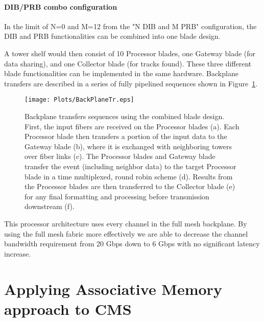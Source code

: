 \paragraph{DIB/PRB combo configuration}

\noindent In the limit of N=0 and M=12 from the "N DIB and M PRB" configuration, the DIB and PRB functionalities can be combined into one blade design.



\noindent A tower shelf would then consist of 10 Processor blades, one Gateway blade (for data sharing), and one Collector blade (for tracks found). These three different blade functionalities can be implemented in the same hardware. Backplane transfers are described in a series of fully pipelined sequences shown in Figure~\ref{fig:BackPlaneTr}.

\begin{figure}[ht!]
\centering
\texttt{[image: Plots/BackPlaneTr.eps]}
\caption{Backplane transfers sequences using the combined blade design. First, the input fibers are received on the Processor blades (a).  Each Processor blade then transfers a portion of the input data to the Gateway blade (b), where it is exchanged with neighboring towers over fiber links (c).  The Processor blades and Gateway blade transfer the event (including neighbor data) to the target Processor blade in a time multiplexed, round robin scheme (d).   Results from the Processor blades are then transferred to the Collector blade (e) for any final formatting and processing before transmission downstream (f).}
\label{fig:BackPlaneTr}
\end{figure}
 

\noindent This processor architecture uses every channel in the full mesh backplane.  By using the full mesh fabric more effectively we are able to decrease the channel bandwidth requirement from 20 Gbps down to 6 Gbps with no significant latency increase. 



\section{Applying Associative Memory approach to CMS }




